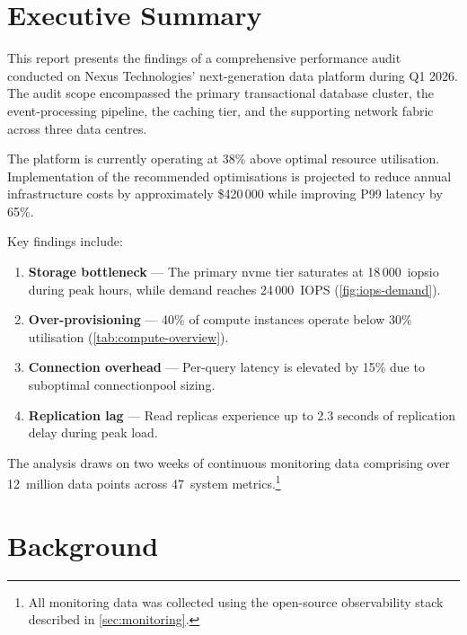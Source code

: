 \documentclass[
    language=english,
    doctype=technical-report,
    institution=none,
    titlestyle=book,
    oneside,
    loadGlossaries,
]{../../omnilatex}
\begin{document}
\maketitle
\tableofcontents
\listoffigures
\listoftables
\listofalgorithms

\chapter{Executive Summary}

This report presents the findings of a comprehensive performance audit
conducted on Nexus Technologies' next-generation data platform during
Q1 2026. The audit scope encompassed the primary transactional database
cluster, the event-processing pipeline, the caching tier, and the
supporting network fabric across three data centres.

\begin{keyfindingbox}
The platform is currently operating at 38\% above optimal resource
utilisation. Implementation of the recommended optimisations is projected
to reduce annual infrastructure costs by approximately \$420\,000 while
improving P99 latency by 65\%.
\end{keyfindingbox}

Key findings include:
\begin{enumerate}
    \item \textbf{Storage bottleneck} --- The primary \gls{nvme} tier
        saturates at 18\,000~\gls{iopsio} during peak hours, while demand
        reaches 24\,000~IOPS (\cref{fig:iops-demand}).
    \item \textbf{Over-provisioning} --- 40\% of compute instances
        operate below 30\% utilisation (\cref{tab:compute-overview}).
    \item \textbf{Connection overhead} --- Per-query latency is elevated
        by 15\% due to suboptimal \gls{connectionpool} sizing.
    \item \textbf{Replication lag} --- Read replicas experience up to
        2.3 seconds of replication delay during peak load.
\end{enumerate}

The analysis draws on two weeks of continuous monitoring data comprising
over 12~million data points across 47~system
metrics.\footnote{All monitoring data was collected using the
open-source observability stack described in \cref{sec:monitoring}.}

\chapter{Background}
\end{document}
